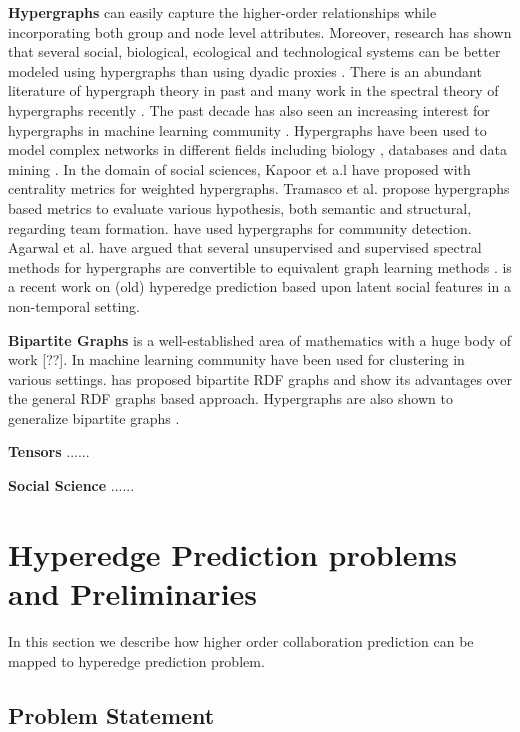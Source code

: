 \documentclass{sig-alternate}
\begin{document}
\textbf{Hypergraphs} can easily capture the higher-order relationships while incorporating both group and node level attributes. Moreover, research has shown that several social, biological, ecological and technological systems can be better modeled using hypergraphs than using dyadic proxies \cite{estrada2005complex}. There is an abundant literature of hypergraph theory in past \cite{berge1973graphs} and many work in the spectral theory of hypergraphs recently \cite{pearson2012spectral}\cite{xie2013h}. The past decade has also seen an increasing interest for hypergraphs in machine learning community \cite{Zhou07}\cite{tian2009hypergraph}. Hypergraphs have been used to model complex networks in different fields including biology \cite{klamt2009hypergraphs}, databases \cite{fagin1983degrees} and data mining \cite{han1998hypergraph}. In the domain of social sciences, Kapoor et a.l \cite{dhruv2013} have proposed with centrality metrics for weighted hypergraphs. Tramasco et al. \cite{taramasco2010academic} propose hypergraphs based metrics to evaluate various hypothesis, both semantic and structural, regarding team formation. \cite{michoel2012alignment} have used hypergraphs for community detection. Agarwal et al. have argued that several unsupervised and supervised spectral methods for hypergraphs are convertible to equivalent graph learning methods \cite{agarwal2008}. \cite{latent2013} is a recent work on (old) hyperedge prediction based upon latent social features in a non-temporal setting.

\textbf{Bipartite Graphs} is a well-established area of mathematics with a huge body of work [??]. In machine learning community have been used for clustering in various settings\cite{clusteringdhillon}\cite{clustering2}\cite{clustering3}. \cite{RDF} has proposed bipartite RDF graphs and show its advantages over the general RDF graphs based approach. Hypergraphs are also shown to generalize bipartite graphs \cite{berge1984hypergraphs}.

\textbf{Tensors} ......

\textbf{Social Science} ......


\section{Hyperedge Prediction problems and Preliminaries}

In this section we describe how higher order collaboration prediction can be mapped to hyperedge prediction problem. 

\subsection{Problem Statement}
\end{document}
